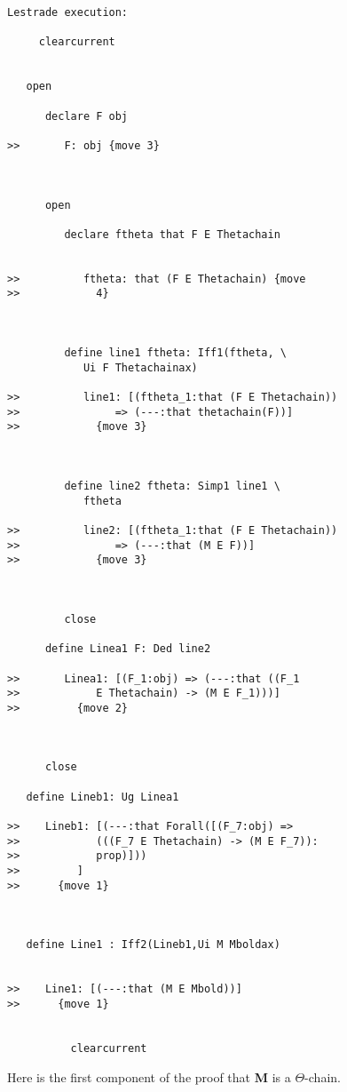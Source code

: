 \documentclass[12pt]{article}
\begin{document}
\begin{verbatim}Lestrade execution:

     clearcurrent


   open

      declare F obj

>>       F: obj {move 3}



      open

         declare ftheta that F E Thetachain


>>          ftheta: that (F E Thetachain) {move
>>            4}



         define line1 ftheta: Iff1(ftheta, \
            Ui F Thetachainax)

>>          line1: [(ftheta_1:that (F E Thetachain))
>>               => (---:that thetachain(F))]
>>            {move 3}



         define line2 ftheta: Simp1 line1 \
            ftheta

>>          line2: [(ftheta_1:that (F E Thetachain))
>>               => (---:that (M E F))]
>>            {move 3}



         close

      define Linea1 F: Ded line2

>>       Linea1: [(F_1:obj) => (---:that ((F_1
>>            E Thetachain) -> (M E F_1)))]
>>         {move 2}



      close

   define Lineb1: Ug Linea1

>>    Lineb1: [(---:that Forall([(F_7:obj) =>
>>            (((F_7 E Thetachain) -> (M E F_7)):
>>            prop)]))
>>         ]
>>      {move 1}



   define Line1 : Iff2(Lineb1,Ui M Mboldax)


>>    Line1: [(---:that (M E Mbold))]
>>      {move 1}


          clearcurrent

\end{verbatim}

Here is the first component of the proof that {\bf M} is a $\Theta$-chain.
\end{document}
